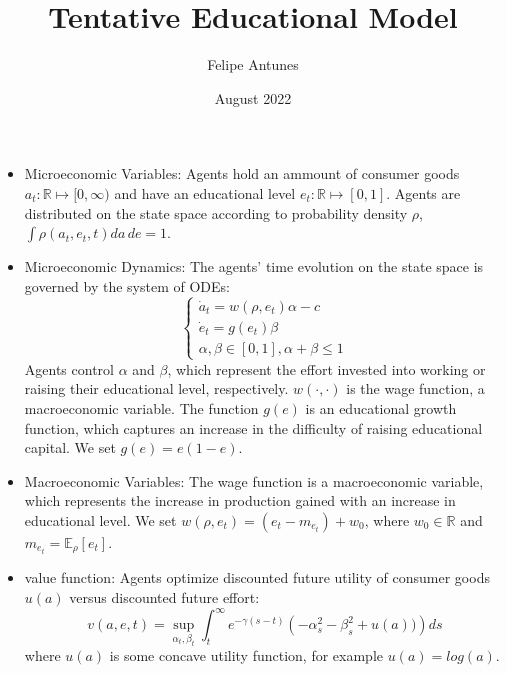 \documentclass{article}
\title{Tentative Educational Model}
\author{Felipe Antunes}
\date{August 2022}
\begin{document}
\maketitle

\begin{itemize}
    \item Microeconomic Variables: Agents hold an ammount of consumer goods $a_t:\mathbb{R} \mapsto [0,\infty)$ and have an educational level $e_t: \mathbb{R} \mapsto [0,1]$. 
    Agents are distributed on the state space according to probability density $\rho$, $\int \rho(a_t, e_t, t) da\, de = 1$.
    \item Microeconomic Dynamics: The agents' time evolution on the state space is governed by the system of ODEs:
    \begin{equation}
        \begin{cases}
            \dot a_t = w(\rho, e_t)\alpha - c \\
            \dot e_t = g(e_t)\beta \\
            \alpha, \beta \in [0,1], \alpha + \beta \leq 1
        \end{cases}
    \end{equation}
    Agents control $\alpha$ and $\beta$, which represent the effort invested into working or raising their educational level, respectively. $w(\cdot, \cdot)$ is the wage function,
    a macroeconomic variable. The function $g(e)$ is an educational growth function, which captures an increase in the difficulty of raising educational capital. We set  
    $g(e) = e(1-e)$.
    \item Macroeconomic Variables: The wage function is a macroeconomic variable, which represents the increase in production gained with an increase in educational level.
    We set $w(\rho, e_t) = (e_t - m_{e_t}) + w_0$, where $w_0 \in \mathbb{R}$ and $m_{e_t} = \mathbb{E}_\rho [e_t]$.
    \item value function: Agents optimize discounted future utility of consumer goods $u(a)$ versus discounted future effort:
    \begin{equation}
        v(a,e,t) = \sup_{\alpha_t, \beta_t} \int_t^\infty e^{- \gamma (s - t)} \left( - \alpha_s^2 - \beta_s^2 + u(a)) \right) ds
    \end{equation}
    where $u(a)$ is some concave utility function, for example $u(a) = log(a)$.


\end{itemize}
\end{document}

